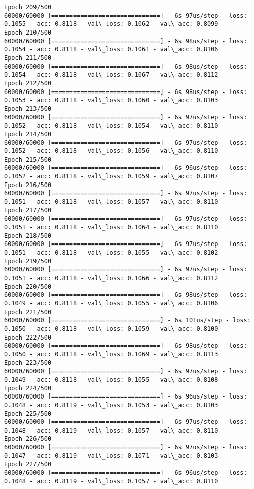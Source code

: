 \documentclass[11pt]{article}
\begin{document}
\begin{Verbatim}[commandchars=\\\{\}]
Epoch 209/500
60000/60000 [==============================] - 6s 97us/step - loss: 0.1055 - acc: 0.8118 - val\_loss: 0.1062 - val\_acc: 0.8099
Epoch 210/500
60000/60000 [==============================] - 6s 98us/step - loss: 0.1054 - acc: 0.8118 - val\_loss: 0.1061 - val\_acc: 0.8106
Epoch 211/500
60000/60000 [==============================] - 6s 98us/step - loss: 0.1054 - acc: 0.8118 - val\_loss: 0.1067 - val\_acc: 0.8112
Epoch 212/500
60000/60000 [==============================] - 6s 98us/step - loss: 0.1053 - acc: 0.8118 - val\_loss: 0.1060 - val\_acc: 0.8103
Epoch 213/500
60000/60000 [==============================] - 6s 97us/step - loss: 0.1052 - acc: 0.8118 - val\_loss: 0.1054 - val\_acc: 0.8110
Epoch 214/500
60000/60000 [==============================] - 6s 97us/step - loss: 0.1052 - acc: 0.8118 - val\_loss: 0.1056 - val\_acc: 0.8110
Epoch 215/500
60000/60000 [==============================] - 6s 96us/step - loss: 0.1052 - acc: 0.8118 - val\_loss: 0.1059 - val\_acc: 0.8107
Epoch 216/500
60000/60000 [==============================] - 6s 97us/step - loss: 0.1051 - acc: 0.8118 - val\_loss: 0.1057 - val\_acc: 0.8110
Epoch 217/500
60000/60000 [==============================] - 6s 97us/step - loss: 0.1051 - acc: 0.8118 - val\_loss: 0.1064 - val\_acc: 0.8110
Epoch 218/500
60000/60000 [==============================] - 6s 97us/step - loss: 0.1051 - acc: 0.8118 - val\_loss: 0.1055 - val\_acc: 0.8102
Epoch 219/500
60000/60000 [==============================] - 6s 97us/step - loss: 0.1051 - acc: 0.8118 - val\_loss: 0.1066 - val\_acc: 0.8112
Epoch 220/500
60000/60000 [==============================] - 6s 98us/step - loss: 0.1049 - acc: 0.8118 - val\_loss: 0.1055 - val\_acc: 0.8106
Epoch 221/500
60000/60000 [==============================] - 6s 101us/step - loss: 0.1050 - acc: 0.8118 - val\_loss: 0.1059 - val\_acc: 0.8100
Epoch 222/500
60000/60000 [==============================] - 6s 98us/step - loss: 0.1050 - acc: 0.8118 - val\_loss: 0.1069 - val\_acc: 0.8113
Epoch 223/500
60000/60000 [==============================] - 6s 97us/step - loss: 0.1049 - acc: 0.8118 - val\_loss: 0.1055 - val\_acc: 0.8108
Epoch 224/500
60000/60000 [==============================] - 6s 96us/step - loss: 0.1048 - acc: 0.8119 - val\_loss: 0.1053 - val\_acc: 0.8103
Epoch 225/500
60000/60000 [==============================] - 6s 97us/step - loss: 0.1048 - acc: 0.8119 - val\_loss: 0.1057 - val\_acc: 0.8110
Epoch 226/500
60000/60000 [==============================] - 6s 97us/step - loss: 0.1047 - acc: 0.8119 - val\_loss: 0.1071 - val\_acc: 0.8103
Epoch 227/500
60000/60000 [==============================] - 6s 96us/step - loss: 0.1048 - acc: 0.8119 - val\_loss: 0.1057 - val\_acc: 0.8110

\end{Verbatim}
\end{document}
